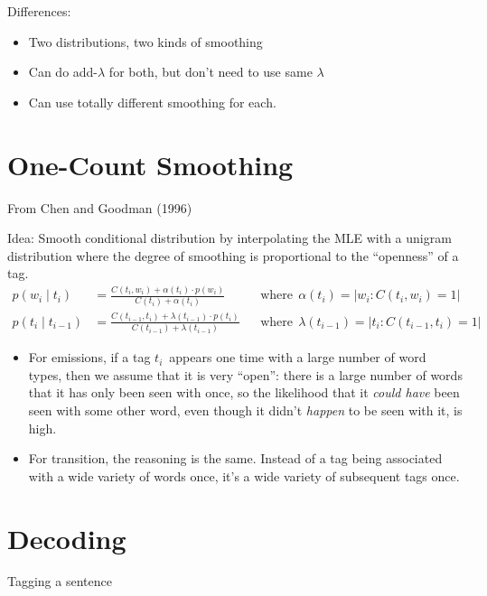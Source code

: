 \documentclass[11pt,letterpaper]{article}
\newcommand{\wcurr}{\ensuremath{w_i}}
\newcommand{\tcurr}{\ensuremath{t_i}}
\newcommand{\tprev}{\ensuremath{t_{i-1}}}
\begin{document}
Differences:

\begin{itemize}
  \item Two distributions, two kinds of smoothing
  \item Can do add-$\lambda$ for both, but don't need to use same $\lambda$
  \item Can use totally different smoothing for each.
\end{itemize}


\section{One-Count Smoothing}

From Chen and Goodman (1996)

Idea: Smooth conditional distribution by interpolating the MLE with a unigram distribution where the degree of smoothing is proportional to the ``openness'' of a tag.
\begin{align*}
  p(\wcurr \mid \tcurr) &= \frac{C(\tcurr,\wcurr) + \alpha(\tcurr) \cdot p(\wcurr)}{C(\tcurr) + \alpha(\tcurr)}
  &&\text{where} ~~ \alpha(\tcurr) = | \wcurr: C(\tcurr,\wcurr) = 1 | \\
  p(\tcurr \mid \tprev) &= \frac{C(\tprev,\tcurr) + \lambda(\tprev) \cdot p(\tcurr)}{C(\tprev) + \lambda(\tprev)}
  &&\text{where} ~~ \lambda(\tprev) = | \tcurr: C(\tprev,\tcurr) = 1 |
\end{align*}

\begin{itemize}
  \item For emissions, if a tag \tcurr\ appears one time with a large number of word types, then we assume that it is very ``open'': there is a large number of words that it has only been seen with once, so the likelihood that it \textit{could have} been seen with some other word, even though it didn't \textit{happen} to be seen with it, is high.
  \item For transition, the reasoning is the same.  Instead of a tag being associated with a wide variety of words once, it's a wide variety of subsequent tags once.
\end{itemize}


\section{Decoding}

Tagging a sentence
\end{document}
